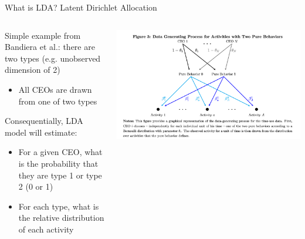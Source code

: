 \documentclass[notes,11pt, aspectratio=169]{beamer}
\newenvironment{wideitemize}{\itemize\addtolength{\itemsep}{10pt}}{\enditemize}
\begin{document}
  \begin{frame}{What is LDA? Latent Dirichlet Allocation}
    \begin{columns}[onlytextwidth, T] %
      \begin{column}{.5\textwidth}
        \begin{wideitemize}
        \item Simple example from Bandiera et al.: there are two types
          (e.g. unobserved dimension of 2)
          \begin{itemize}
          \item All CEOs are drawn from one of two types            
          \end{itemize}
        \item Consequentially, LDA model will estimate:
          \begin{itemize}
          \item For a given CEO, what is the probability that they are type 1 or type 2 (0 or 1)
          \item For each type, what is the relative distribution of each activity
          \end{itemize}
        \end{wideitemize}
      \end{column}%
      \hfill%
      \begin{column}{.5\textwidth}
        \includegraphics[width=\linewidth]{images/bandiera_2.png}
      \end{column}%
    \end{columns}
  \end{frame}
\end{document}
